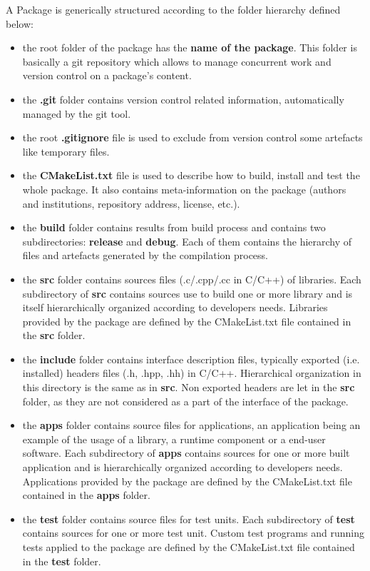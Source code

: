 \documentclass[12pt,a4paper]{article}
\begin{document}
A Package is generically structured according to the folder hierarchy defined below:
\begin{itemize}
\item the root folder of the package has the \textbf{name of the package}. This folder is basically a git repository which allows to manage concurrent work and version control on a package's content.
\item the \textbf{.git} folder contains version control related information, automatically managed by the git tool.
\item the root \textbf{.gitignore} file is used to exclude from version control some artefacts like temporary files.
\item the \textbf{CMakeList.txt} file is used to describe how to build, install and test the whole package. It also contains meta-information on the package (authors and institutions, repository address, license, etc.).
\item the \textbf{build} folder contains results from build process and contains two subdirectories: \textbf{release} and \textbf{debug}. Each of them contains the hierarchy of files and artefacts generated by the compilation process.
\item the \textbf{src} folder contains sources files (.c/.cpp/.cc in C/C++) of libraries. Each subdirectory of \textbf{src} contains sources use to build one or more library and is itself hierarchically organized according to developers needs. Libraries provided by the package are defined by the CMakeList.txt file contained in the \textbf{src} folder.
\item the \textbf{include} folder contains interface description files, typically exported (i.e. installed) headers files (.h, .hpp, .hh) in C/C++. Hierarchical organization in this directory is the same as in \textbf{src}. Non exported headers are let in the \textbf{src} folder, as they are not considered as a part of the interface of the package.
\item the \textbf{apps} folder contains source files for applications, an application being an example of the usage of a library, a runtime component or a end-user software. Each subdirectory of \textbf{apps} contains sources for one or more built application and is hierarchically organized according to developers needs. Applications provided by the package are defined by the CMakeList.txt file contained in the \textbf{apps} folder.
\item the \textbf{test} folder contains source files for test units. Each subdirectory of \textbf{test} contains sources for one or more test unit. Custom test programs and running tests applied to the package are defined by the CMakeList.txt file contained in the \textbf{test} folder.

\end{itemize}
\end{document}
